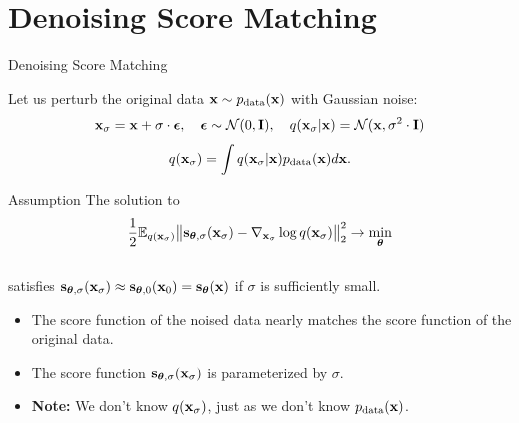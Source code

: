 \documentclass{beamer}
\begin{document}
\section{Denoising Score Matching}
\begin{frame}{Denoising Score Matching}

	Let us perturb the original data $\mathbf{x} \sim p_{\text{data}}(\mathbf{x})$ with Gaussian noise:
	\vspace{-0.3cm}
	\[
		\mathbf{x}_{\sigma} = \mathbf{x} + \sigma \cdot \boldsymbol{\epsilon}, \quad \boldsymbol{\epsilon} \sim \mathcal{N}(0, \mathbf{I}), \quad q(\mathbf{x}_{\sigma} | \mathbf{x}) = \mathcal{N}(\mathbf{x}, \sigma^2 \cdot \mathbf{I})
	\]
	\eqpause
	\vspace{-0.4cm}
	\[
		q(\mathbf{x}_{\sigma}) = \int q(\mathbf{x}_{\sigma} | \mathbf{x}) p_{\text{data}}(\mathbf{x}) d\mathbf{x}.
	\]
	\eqpause
	\vspace{-0.5cm}
	\begin{block}{Assumption}
		The solution to
		\[
			\frac{1}{2} \mathbb{E}_{q(\mathbf{x}_{\sigma})}\big\| \mathbf{s}_{\boldsymbol{\theta}, \sigma}(\mathbf{x}_{\sigma}) - \nabla_{\mathbf{x}_{\sigma}} \log q(\mathbf{x}_{\sigma}) \big\|^2_2 \rightarrow \min_{\boldsymbol{\theta}}
		\]
		\vspace{-0.3cm} \\
		satisfies $\mathbf{s}_{\boldsymbol{\theta}, \sigma}(\mathbf{x}_{\sigma}) \approx \mathbf{s}_{\boldsymbol{\theta}, 0}(\mathbf{x}_0) = \mathbf{s}_{\boldsymbol{\theta}}(\mathbf{x})$ if $\sigma$ is sufficiently small.
	\end{block}
	\eqpause
	\begin{itemize}
		\item The score function of the noised data nearly matches the score function of the original data.
		\item The score function $\mathbf{s}_{\boldsymbol{\theta}, \sigma}(\mathbf{x}_{\sigma})$ is parameterized by $\sigma$.
		\item \textbf{Note:} We don't know $q(\mathbf{x}_{\sigma})$, just as we don't know $p_{\text{data}}(\mathbf{x})$.
	\end{itemize}
\end{frame}
\end{document}
